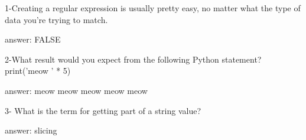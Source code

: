 1-Creating a regular expression is usually pretty easy, no matter what the type of data you're trying to match.


answer: FALSE

2-What result would you expect from the following Python statement?
  print('meow ' * 5)


answer: meow meow meow meow meow

3- What is the term for getting part of a string value?


answer: slicing
